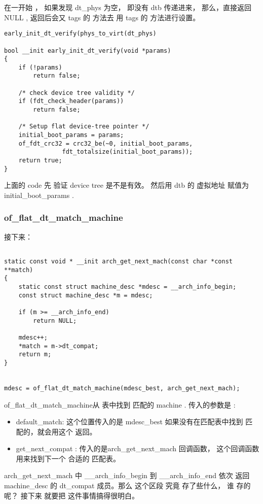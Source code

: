 在一开始 ，  如果发现 dt\_phys 为空， 即没有 dtb 传递进来， 那么，直接返回NULL , 返回后会又 tags 的 方法去 用 tags 的 方法进行设置。 
\begin{lstlisting} 
early_init_dt_verify(phys_to_virt(dt_phys)

bool __init early_init_dt_verify(void *params)
{
	if (!params)
		return false;

	/* check device tree validity */
	if (fdt_check_header(params))
		return false;

	/* Setup flat device-tree pointer */
	initial_boot_params = params;
	of_fdt_crc32 = crc32_be(~0, initial_boot_params,
				fdt_totalsize(initial_boot_params));
	return true;
}

\end{lstlisting}
上面的 code 先 验证 device tree 是不是有效。 然后用  dtb 的 虚拟地址 赋值为initial\_boot\_params \label{a1} .



\subsubsection{of\_flat\_dt\_match\_machine}

接下来：

\begin{lstlisting}

static const void * __init arch_get_next_mach(const char *const **match)
{
	static const struct machine_desc *mdesc = __arch_info_begin;
	const struct machine_desc *m = mdesc;

	if (m >= __arch_info_end)
		return NULL;

	mdesc++;
	*match = m->dt_compat;
	return m;
}


mdesc = of_flat_dt_match_machine(mdesc_best, arch_get_next_mach);
\end{lstlisting}

of\_flat\_dt\_match\_machine从 表中找到 匹配的 machine . 传入的参数是 :
\begin{itemize}
    \item default\_match:  这个位置传入的是 mdesc\_best  如果没有在匹配表中找到 匹配的，就会用这个
    返回。
    \item get\_next\_compat : 传入的是arch\_get\_next\_mach  回调函数， 这个回调函数
    用来找到下一个 合适的 匹配表。
    
\end{itemize}


arch\_get\_next\_mach 中 \_\_arch\_info\_begin 到 \_\_arch\_info\_end 依次 返回machine\_desc 的 dt\_compat
成员。那么 这个区段 究竟 存了些什么， 谁 存的 呢？ 接下来 就要把 这件事情搞得很明白。


